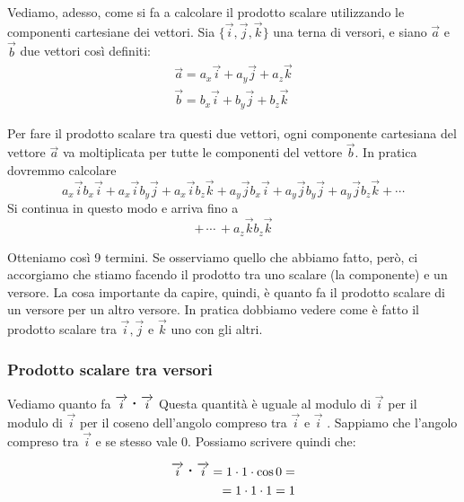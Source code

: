 Vediamo, adesso, come si fa a calcolare il prodotto scalare utilizzando le componenti cartesiane dei vettori.
Sia $\lbrace \overrightarrow{i},  \overrightarrow{j}, \overrightarrow{k} \rbrace $ una terna di versori, e siano $\overrightarrow{a}$ e $ \overrightarrow{b} $ due vettori così definiti:
\begin{align*}
 \overrightarrow{a} = a_{x} \overrightarrow{i} + a_{y} \overrightarrow{j} + a_{z} \overrightarrow{k} \\
 \overrightarrow{b} = b_{x} \overrightarrow{i} + b_{y} \overrightarrow{j} + b_{z} \overrightarrow{k}
 \end{align*} 
 
Per fare il prodotto scalare tra questi due vettori, ogni componente cartesiana del vettore $ \overrightarrow{a} $ va moltiplicata per tutte le componenti del vettore $\overrightarrow{b} $. In pratica dovremmo calcolare
$$ a_{x} \overrightarrow{i} b_{x}\overrightarrow{i} + a_{x} \overrightarrow{i} b_{y}\overrightarrow{j} + a_{x} \overrightarrow{i} b_{z}\overrightarrow{k} + a_{y} \overrightarrow{j} b_{x}\overrightarrow{i} + a_{y} \overrightarrow{j} b_{y}\overrightarrow{j} + a_{y} \overrightarrow{j} b_{z}\overrightarrow{k} + \cdots  $$
Si continua in questo modo e  arriva fino a
$$ + \,  \cdots \, + a_{z} \overrightarrow{k} b_{z} \overrightarrow{k} $$

Otteniamo così 9 termini. Se osserviamo quello che abbiamo fatto, però, ci accorgiamo che stiamo facendo il prodotto tra uno scalare (la componente) e un versore. La cosa importante da capire, quindi, è quanto fa il prodotto scalare di un versore per un altro versore. In pratica dobbiamo vedere come è fatto il prodotto scalare tra $\overrightarrow{i},  \overrightarrow{j}$ e $\overrightarrow{k}$ uno con gli altri.

\subsubsection{Prodotto scalare tra versori}
Vediamo quanto fa $\overrightarrow{i} \prodscal \overrightarrow{i} $
Questa quantità è uguale al modulo di $\overrightarrow{i}$ per il modulo di $\overrightarrow{i} $ per il coseno dell'angolo compreso tra $ \overrightarrow{i} $ e $\overrightarrow{i}$ .
Sappiamo che l'angolo compreso tra $ \overrightarrow{i} $ e se stesso vale 0. Possiamo scrivere quindi che:

\begin{align*}
\overrightarrow{i} \prodscal \overrightarrow{i} = 1 \cdot 1 \cdot \cos 0 = \\
= 1 \cdot 1 \cdot 1 = 1 
\end{align*}

